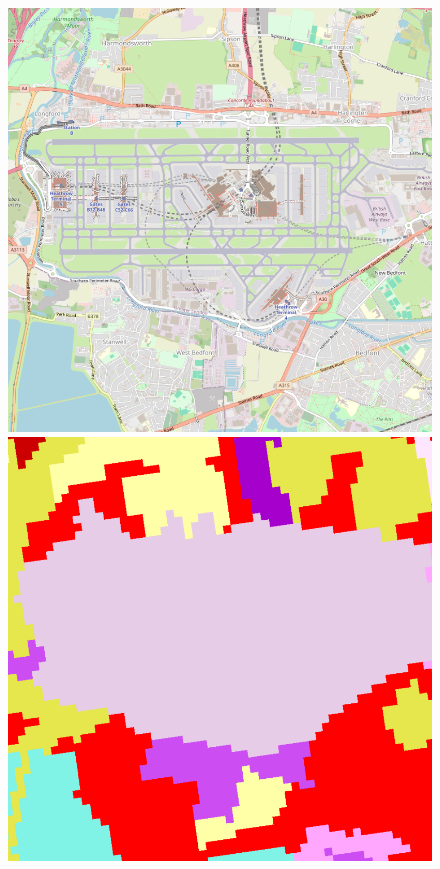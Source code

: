             \begin{figure}[H]
            \centering
            \begin{minipage}{0.48\textwidth}
                \centering
                \includegraphics[width=\linewidth]{figs_06/heathrow_osm.png}
                \includegraphics[width=\linewidth]{figs_06/heathrow_clc.png}

\end{minipage}
\end{figure}
